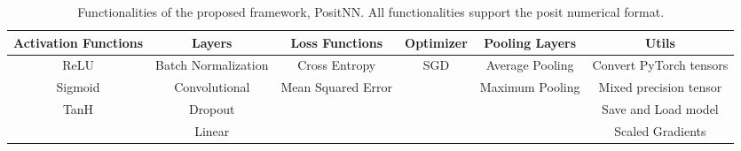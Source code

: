 \begin{table*}[htb]
    \small
    \vspace*{-\baselineskip}
    \centering
    \caption{Functionalities of the proposed framework, PositNN. All functionalities support the posit numerical format.}
    \label{tab:functionalities}
    \begin{tabular}{@{}cccccc@{}}
        \toprule
        Activation Functions & Layers & Loss Functions & Optimizer & Pooling Layers & Utils \\ \midrule
        ReLU & Batch Normalization & Cross Entropy & SGD & Average Pooling & Convert PyTorch tensors \\
        Sigmoid & Convolutional & Mean Squared Error &  & Maximum Pooling & Mixed precision tensor \\
        TanH & Dropout &  &  &  & Save and Load model \\
         & Linear &  &  &  & Scaled Gradients \\ \bottomrule
    \end{tabular}
\end{table*}